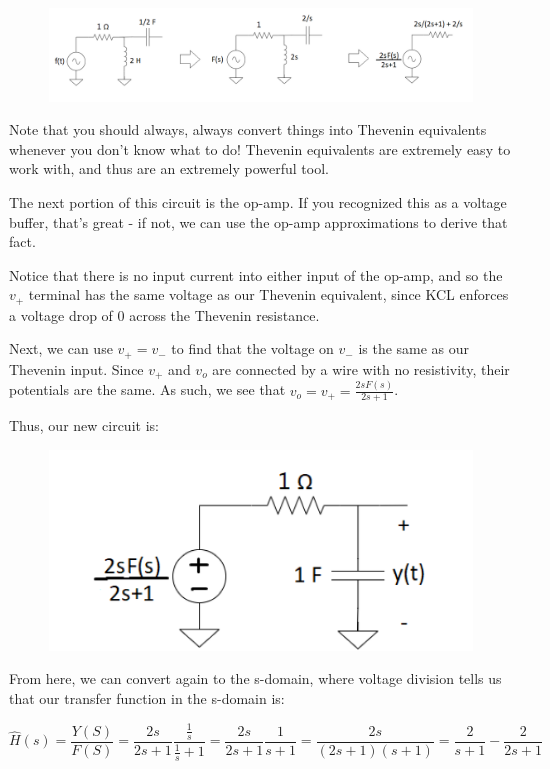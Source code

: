 \documentclass{article}
\begin{document}
\begin{figure}[h]
\begin{center}
    \includegraphics[width=
    \textwidth]{figures/step1.png}
\end{center}
\end{figure}

Note that you should always, always convert things into Thevenin equivalents whenever you don't know what to do! Thevenin equivalents are extremely easy to work with, and thus are an extremely powerful tool.

The next portion of this circuit is the op-amp. If you recognized this as a voltage buffer, that's great - if not, we can use the op-amp approximations to derive that fact. 

Notice that there is no input current into either input of the op-amp, and so the $v_+$ terminal has the same voltage as our Thevenin equivalent, since KCL enforces a voltage drop of 0 across the Thevenin resistance. 

Next, we can use $v_+ = v_-$ to find that the voltage on $v_-$ is the same as our Thevenin input. Since $v_+$ and $v_o$ are connected by a wire with no resistivity, their potentials are the same. As such, we see that $v_o = v_+ = \frac{2sF(s)}{2s+1}$.

Thus, our new circuit is:

\begin{figure}[h]
\begin{center}
    \includegraphics[width= 0.5
    \textwidth]{figures/step2.png}
\end{center}
\end{figure}

From here, we can convert again to the s-domain, where voltage division tells us that our transfer function in the s-domain is:

\[
\hat{H}(s) = \frac{Y(S)}{F(S)} = \frac{2s}{2s+1}\frac{\frac{1}{s}}{\frac{1}{s}+1} = \frac{2s}{2s+1}\frac{1}{s+1} = \frac{2s}{(2s+1)(s+1)} = \frac{2}{s+1} - \frac{2}{2s+1}
\]
\end{document}
